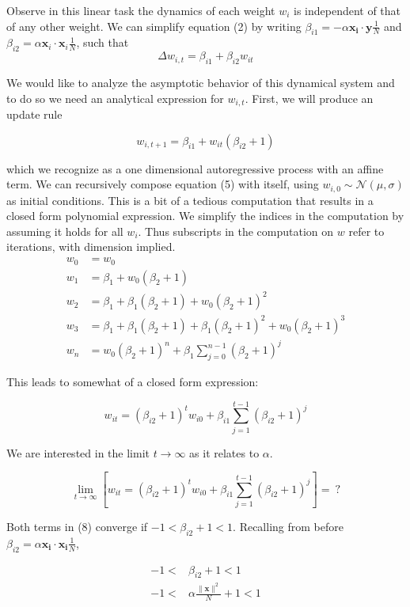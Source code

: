 \documentclass[]{article}
\begin{document}
Observe in this linear task the dynamics of each weight \(w_i\) is
independent of that of any other weight. We can simplify equation (2) by
writing \(\beta_ {i1}= - \alpha\mathbf{x_i}\cdot\mathbf{y}\frac{1}{N}\)
and \(\beta_{i2}=\alpha\mathbf{x}_i \cdot\mathbf{x}_i\frac{1}{N}\), such
that \[
\Delta w_{i,t} = \beta_{i1}+\beta_{i2}w_{it}
\]

We would like to analyze the asymptotic behavior of this dynamical
system and to do so we need an analytical expression for \(w_{i,t}\).
First, we will produce an update rule

\[
w_{i,t+1} = \beta_{i1}+w_{it} (\beta_{i2}+1)
\]

which we recognize as a one dimensional autoregressive process with an
affine term. We can recursively compose equation (5) with itself, using
\(w_{i,0} \sim \mathcal{N}(\mu, \sigma)\) as initial conditions. This is
a bit of a tedious computation that results in a closed form polynomial
expression. We simplify the indices in the computation by assuming it
holds for all \(w_i\). Thus subscripts in the computation on \(w\) refer
to iterations, with dimension implied.
\begin{align}
w_{0} &= w_0\\
w_{1} &= \beta_1+w_0(\beta_2+1)  \\
w_2  &= \beta_1+\beta_1(\beta_2+1)+w_0(\beta_2+1)^2\\
w_3 &= \beta_1 + \beta_1(\beta_2+1)+\beta_1(\beta_2+1)^2+w_0(\beta_2+1)^3\\
w_n &=w_0(\beta_2 + 1)^n +  \beta_1\sum^{n-1}_{j=0}(\beta_2+1)^j
\end{align}

This leads to somewhat of a closed form expression:

\[
w_{it} = (\beta_{i2}+1)^t w_{i0}+\beta_{i1}\sum\limits^{t-1}_{j=1}(\beta_{i2}+1)^j
\]

We are interested in the limit \(t\to \infty\) as it relates to
\(\alpha\).

\[
\lim\limits_{t\to\infty} \left [w_{it} = (\beta_{i2}+1)^t w_{i0}+\beta_{i1}\sum\limits^{t-1}_{j=1}(\beta_{i2}+1)^j \right] =\ ?
\]

Both terms in (8) converge if \(-1 < \beta_{i2}+1 < 1\). Recalling from
before \(\beta_{i2} =\alpha\mathbf{x_i}\cdot\mathbf{x_i}\frac{1}{N}\),

\begin{align}
-1 < &\beta_{i2}+1  <1 \\
-1 < &\alpha\frac{\|\mathbf{x}\|^2}{N} + 1 < 1 \\
\end{align}
\end{document}
